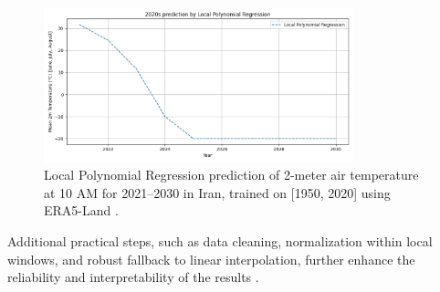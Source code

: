\begin{figure}[htbp]
    \centering
    \includegraphics[width=0.8\textwidth]{../figs/2020s-prediction.png}
    \caption{Local Polynomial Regression prediction of 2-meter air temperature at 10 AM for 2021--2030 in Iran, trained on [1950, 2020] using ERA5-Land \cite{ERA5}.}
    \label{fig:future-prediction}
\end{figure}

Additional practical steps, such as data cleaning, normalization within local windows, and robust fallback to linear interpolation, further enhance the reliability and interpretability of the results \cite{burden2011numerical}.